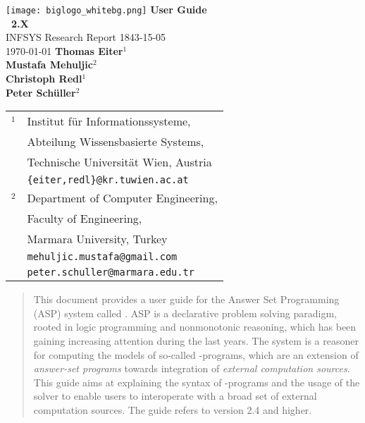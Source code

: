 \documentclass[a4paper, titlepage]{article}
\begin{document}
\begin{titlepage}
    \centering
    \texttt{[image: biglogo\_whitebg.png]}
    \vskip2cm
        {\bfseries\Huge User Guide} \\[1em]
        {\bfseries\Huge \dlvhex\ 2.X} \\
        \vskip1.0cm
        {\sc\Large INFSYS Research Report 1843-15-05} \\
        \medskip
        {\Large \today}        
        \vskip2cm
        {\bfseries\Large
        Thomas Eiter$^1$\\[2mm]
        Mustafa Mehuljic$^2$ \\[2mm] %
        Christoph Redl$^1$ \\[2mm]
        Peter Sch\"{u}ller$^2$ \\[2mm]
        }    
        \vspace{1cm}
        \begin{tabular}{r@{}l}
        {\Large$^1$}
          & Institut f\"ur Informationssysteme,\\
          & Abteilung Wissensbasierte Systems,\\
          & Technische Universit\"at Wien, Austria \\
          & {\tt\{eiter,redl\}@kr.tuwien.ac.at} \\[1ex]
        {\Large$^2$}
          & Department of Computer Engineering,\\
          & Faculty of Engineering, \\
          & Marmara University, Turkey \\
          & {\tt mehuljic.mustafa@gmail.com}\\
          & {\tt peter.schuller@marmara.edu.tr}
        \end{tabular}
        \vspace{4cm}
\end{titlepage}
%
%
\begin{abstract}
This document provides a user guide for the Answer Set 
Programming (ASP) system called \dlvhex{}.
ASP is a declarative 
problem solving paradigm, rooted in logic programming and 
nonmonotonic reasoning, which has been gaining increasing 
attention during the last years. The \dlvhex{} system is a 
reasoner for computing the models of so-called \hex{}-programs, which are an extension of \emph{answer-set 
programs} towards integration of \emph{external computation 
sources}. This guide aims at explaining the syntax
of \hex{}-programs and the usage of the \dlvhex{} solver
to enable users 
to interoperate with a broad set of external computation 
sources. The guide refers to version 2.4 and higher.
\end{abstract}
\end{document}
